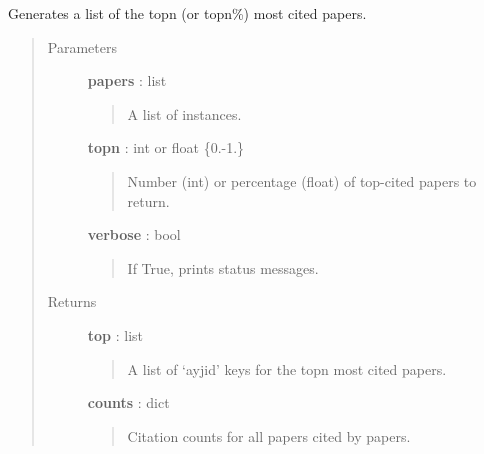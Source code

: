 \documentclass[letterpaper,10pt,english]{sphinxmanual}
\begin{document}
\begin{fulllineitems}
\label{tethne.networks.helpers:tethne.networks.helpers.top_cited}
Generates a list of the topn (or topn\%) most cited papers.
\begin{quote}\begin{description}
\item[{Parameters}] \leavevmode
\textbf{papers} : list
\begin{quote}

A list of {\hyperref[tethne.classes.paper:tethne.classes.paper.Paper]{}} instances.
\end{quote}

\textbf{topn} : int or float \{0.-1.\}
\begin{quote}

Number (int) or percentage (float) of top-cited papers to return.
\end{quote}

\textbf{verbose} : bool
\begin{quote}

If True, prints status messages.
\end{quote}

\item[{Returns}] \leavevmode
\textbf{top} : list
\begin{quote}

A list of `ayjid' keys for the topn most cited papers.
\end{quote}

\textbf{counts} : dict
\begin{quote}

Citation counts for all papers cited by papers.
\end{quote}

\end{description}\end{quote}

\end{fulllineitems}

\end{document}
